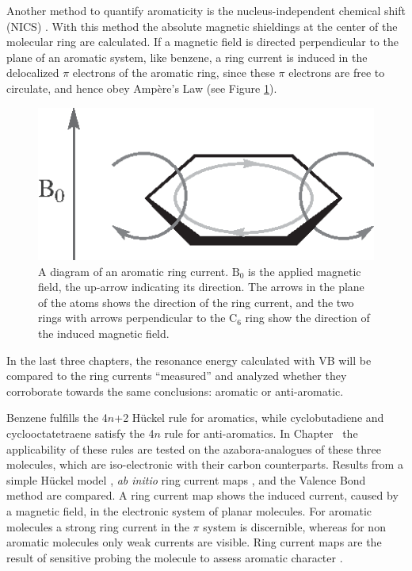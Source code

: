 Another method to quantify aromaticity is the nucleus-independent chemical shift (NICS) \cite{schleyer}. With this method the absolute magnetic shieldings at the center of the molecular ring are calculated. If a magnetic field is directed perpendicular to the plane of an aromatic system, like benzene, a ring current is induced in the delocalized $\pi$ electrons of the aromatic ring, since these $\pi$ electrons are free to circulate, and hence obey Amp\`{e}re's Law (see Figure \ref{ch1.fig.ringcurrent}).
\begin{figure}[htdp]
\center
\includegraphics{introduction/figures/ringcurrent.eps}
\caption{A diagram of an aromatic ring current. $\mathrm{B_0}$ is the applied magnetic field, the up-arrow indicating its direction. The arrows in the plane of the atoms shows the direction of the ring current, and the two rings with arrows perpendicular to the C$_6$ ring show the direction of the induced magnetic field.}
\label{ch1.fig.ringcurrent}
\end{figure}
In the last three chapters, the resonance energy calculated with VB will be compared to the ring currents ``measured'' and analyzed whether they corroborate towards the same conclusions: aromatic or anti-aromatic.

Benzene fulfills the 4$n$+2 H\"{u}ckel rule for aromatics, while cyclobutadiene and cyclooctatetraene satisfy the 4$n$ rule for anti-aromatics. In Chapter \chhuckel\ the applicability of these rules are tested on the azabora-analogues of these three molecules, which are iso-electronic with their carbon counterparts. Results from a simple H\"{u}ckel model \cite{huckel1,huckel2,huckel3}, \textit{ab initio} ring current maps \cite{london,keithb1,keithb2}, and the Valence Bond method are compared. A ring current map shows the induced current, caused by a magnetic field, in the electronic system of planar molecules. For aromatic molecules a strong ring current in the $\pi$ system is discernible, whereas for non aromatic molecules only weak currents are visible. Ring current maps are the result of sensitive probing the molecule to assess aromatic character \cite{huckel}.

